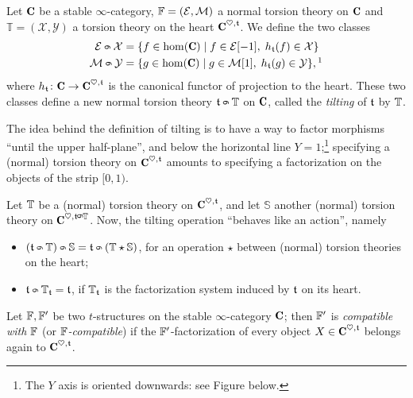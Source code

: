 \documentclass[a4paper,12pt]{amsart}
\begin{document}
\begin{definition}
Let $\C$ be a stable $\infty$\hyp{}category, $\mathbb{F} = (\mathcal{E}, \mathcal{M})$ a normal torsion theory on $\C$ and $\mathbb{T} = (\mathcal{X}, \mathcal{Y})$ a torsion theory on the heart $\C^{\heart, \tee}$. We define the two classes
\begin{align}
\E \tilt \mathcal{X} &= \{f\in \hom(\C)\mid f\in \E [-1],\; h_\tee(f)\in \mathcal{X}\}\notag\\
\M \tilt \mathcal{Y} &= \{g\in \hom(\C)\mid g\in \M [1], \; h_\tee(g)\in \mathcal{Y}\},\footnotemark
\end{align}
where $h_\tee\colon \C \to \C^{\heart,\tee}$ is the canonical functor of projection to the heart. These two classes define a new normal torsion theory $\tee \tilt \mathbb{T}$ on $\C$, called the \emph{tilting} of $\mathfrak{t}$ by $\mathbb{T}$.
\end{definition}
\begin{remark}
The idea behind the definition of tilting is to have a way to factor morphisms ``until the upper half\hyp{}plane'', and below the horizontal line $Y=1$;\footnote{The $Y$ axis is oriented downwards: see Figure  below.} specifying a (normal) torsion theory on $\C^{\heart, \tee}$ amounts to specifying a factorization on the objects of the strip $[0,1)$.
\end{remark}
\begin{proposition}
Let $\mathbb{T}$ be a (normal) torsion theory on $\C^{\heart,\tee}$, and let $\mathbb{S}$ another (normal) torsion theory on $\C^{\heart, \tee\tilt \bT}$.  Now, the tilting operation ``behaves like an action'', namely
\begin{itemize}
\item $(\tee\tilt \bT)\tilt \mathbb{S} = \tee \tilt (\bT \star \mathbb{S})$, for an operation $\star$ between (normal) torsion theories on the heart; 
\item $\tee \tilt \bT_{\tee} = \tee$, if $\mathbb{T}_{\mathfrak{t}}$ is the factorization system induced by $\mathfrak{t}$ on its heart.
\end{itemize}
\end{proposition}
\begin{definition}
Let $\mathbb{F}, \mathbb{F}'$ be two $t$\hyp{}structures on the stable $\infty$\hyp{}category $\C$; then $\mathbb{F}'$ is \emph{compatible with $\mathbb{F}$} (or \emph{$\mathbb{F}$\hyp{}compatible}) if the $\mathbb{F}'$\hyp{}factorization of every object $X\in\C^{\heart,\tee}$ belongs again to $\C^{\heart,\tee}$.
\end{definition}
\end{document}
